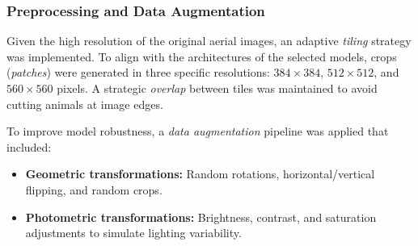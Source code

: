 \subsubsection{Preprocessing and Data Augmentation}

Given the high resolution of the original aerial images, an adaptive \textit{tiling} strategy was implemented. To align with the architectures of the selected models, crops (\textit{patches}) were generated in three specific resolutions: $384 \times 384$, $512 \times 512$, and $560 \times 560$ pixels. A strategic \textit{overlap} between tiles was maintained to avoid cutting animals at image edges.

To improve model robustness, a \textit{data augmentation} pipeline was applied that included:
\begin{itemize}
    \item \textbf{Geometric transformations:} Random rotations, horizontal/vertical flipping, and random crops.
    \item \textbf{Photometric transformations:} Brightness, contrast, and saturation adjustments to simulate lighting variability.
\end{itemize}

